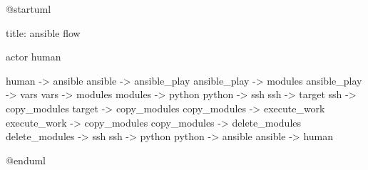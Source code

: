 @startuml

title: ansible flow

actor human

human -> ansible
ansible -> ansible_play
ansible_play -> modules
ansible_play -> vars
vars -> modules
modules -> python
python -> ssh
ssh -> target
ssh -> copy_modules
target -> copy_modules
copy_modules -> execute_work
execute_work -> copy_modules
copy_modules -> delete_modules
delete_modules -> ssh
ssh -> python
python -> ansible
ansible -> human

@enduml
